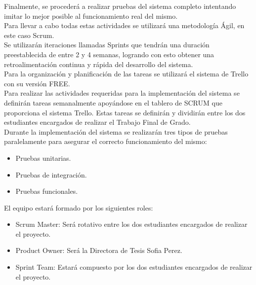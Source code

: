 Finalmente, se procederá a realizar pruebas del sistema completo intentando imitar lo mejor posible al funcionamiento real del mismo.\\

Para llevar a cabo todas estas actividades se utilizará una metodología Ágil, en este caso Scrum.\\

Se utilizarán iteraciones llamadas Sprints que tendrán una duración preestablecida de entre 2 y 4 semanas, logrando con esto obtener una retroalimentación continua y rápida del desarrollo del sistema.\\

Para la organización y planificación de las tareas se utilizará el sistema de Trello con su versión FREE. \\

Para realizar las actividades requeridas para la implementación del sistema se definirán tareas semanalmente apoyándose en el tablero de SCRUM que proporciona el sistema Trello. Estas tareas se definirán y dividirán entre los dos estudiantes encargados de realizar el Trabajo Final de Grado.\\

Durante la implementación del sistema se realizarán tres tipos de pruebas paralelamente para asegurar el correcto funcionamiento del mismo:

\begin{itemize}
	\item Pruebas unitarias.
	\item Pruebas de integración.
	\item Pruebas funcionales.\\
\end{itemize}

El equipo estará formado por los siguientes roles:
\begin{itemize}
	\item Scrum Master: Será rotativo entre los dos estudiantes encargados de realizar el proyecto.
	\item Product Owner: Será la Directora de Tesis Sofia Perez.
	\item Sprint Team: Estará compuesto por los dos estudiantes encargados de realizar el proyecto.\\
\end{itemize}

